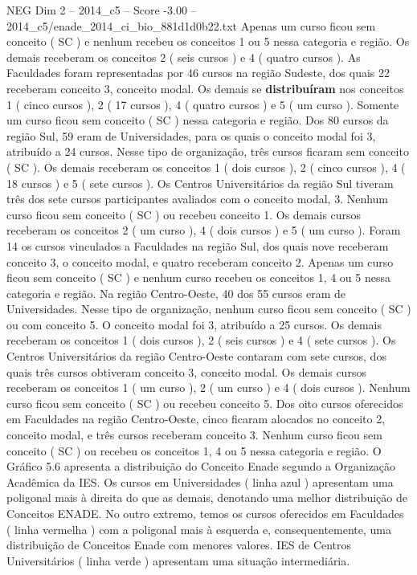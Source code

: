 \begin{textsample}{NEG Dim 2 – 2014\_c5 – Score -3.00 – 2014\_c5/enade\_2014\_ci\_bio\_881d1d0b22.txt}
Apenas um curso ficou sem conceito ( SC ) e nenhum recebeu os conceitos 1 ou 5 nessa categoria e região.
Os demais receberam os conceitos 2 ( seis cursos ) e 4 ( quatro cursos ).
As Faculdades foram representadas por 46 cursos na região Sudeste, dos quais 22 receberam conceito 3, conceito modal.
Os demais se \textbf{distribuíram} nos conceitos 1 ( cinco cursos ), 2 ( 17 cursos ), 4 ( quatro cursos ) e 5 ( um curso ).
Somente um curso ficou sem conceito ( SC ) nessa categoria e região.
Dos 80 cursos da região Sul, 59 eram de Universidades, para os quais o conceito modal foi 3, atribuído a 24 cursos.
Nesse tipo de organização, três cursos ficaram sem conceito ( SC ).
Os demais receberam os conceitos 1 ( dois cursos ), 2 ( cinco cursos ), 4 ( 18 cursos ) e 5 ( sete cursos ).
Os Centros Universitários da região Sul tiveram três dos sete cursos participantes avaliados com o conceito modal, 3.
Nenhum curso ficou sem conceito ( SC ) ou recebeu conceito 1.
Os demais cursos receberam os conceitos 2 ( um curso ), 4 ( dois cursos ) e 5 ( um curso ).
Foram 14 os cursos vinculados a Faculdades na região Sul, dos quais nove receberam conceito 3, o conceito modal, e quatro receberam conceito 2.
Apenas um curso ficou sem conceito ( SC ) e nenhum curso recebeu os conceitos 1, 4 ou 5 nessa categoria e região.
Na região Centro-Oeste, 40 dos 55 cursos eram de Universidades.
Nesse tipo de organização, nenhum curso ficou sem conceito ( SC ) ou com conceito 5.
O conceito modal foi 3, atribuído a 25 cursos.
Os demais receberam os conceitos 1 ( dois cursos ), 2 ( seis cursos ) e 4 ( sete cursos ).
Os Centros Universitários da região Centro-Oeste contaram com sete cursos, dos quais três cursos obtiveram conceito 3, conceito modal.
Os demais cursos receberam os conceitos 1 ( um curso ), 2 ( um curso ) e 4 ( dois cursos ).
Nenhum curso ficou sem conceito ( SC ) ou recebeu conceito 5.
Dos oito cursos oferecidos em Faculdades na região Centro-Oeste, cinco ficaram alocados no conceito 2, conceito modal, e três cursos receberam conceito 3.
Nenhum curso ficou sem conceito ( SC ) ou recebeu os conceitos 1, 4 ou 5 nessa categoria e região.
O Gráfico 5.6 apresenta a distribuição do Conceito Enade segundo a Organização Acadêmica da IES.
Os cursos em Universidades ( linha azul ) apresentam uma poligonal mais à direita do que as demais, denotando uma melhor distribuição de Conceitos ENADE.
No outro extremo, temos os cursos oferecidos em Faculdades ( linha vermelha ) com a poligonal mais à esquerda e, consequentemente, uma distribuição de Conceitos Enade com menores valores.
IES de Centros Universitários ( linha verde ) apresentam uma situação intermediária.

\end{textsample}
